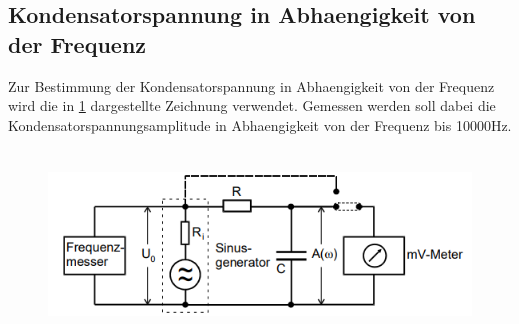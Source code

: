 \subsection{Kondensatorspannung in Abhaengigkeit von der Frequenz}
Zur Bestimmung der Kondensatorspannung in Abhaengigkeit von der Frequenz wird die in \ref{Fig:Frequenz} dargestellte Zeichnung verwendet. Gemessen werden soll dabei die Kondensatorspannungsamplitude in Abhaengigkeit von der Frequenz bis 10000Hz. 
\begin{figure}[H]
    \centering
    \captionsetup{justification=centering}
    \includegraphics[height=5cm]{"Frequenz_RCKreis.png"}
    \label{Fig:Frequenz}
\end{figure}
